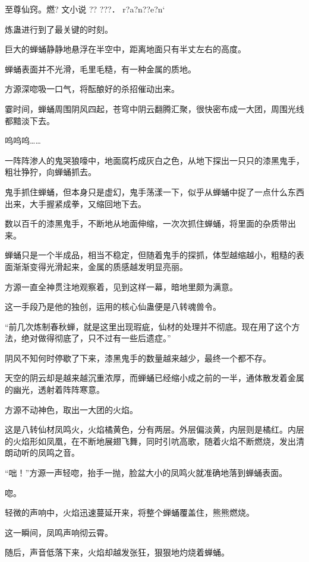 
\begin{this_body}

至尊仙窍。燃? 文小说 ??   ???． r?a?n??e?n`

炼蛊进行到了最关键的时刻。

巨大的蝉蛹静静地悬浮在半空中，距离地面只有半丈左右的高度。

蝉蛹表面并不光滑，毛里毛糙，有一种金属的质地。

方源深唿吸一口气，将酝酿好的杀招催动出来。

霎时间，蝉蛹周围阴风四起，苍穹中阴云翻腾汇聚，很快密布成一大团，周围光线都黯淡下去。

呜呜呜……

一阵阵渗人的鬼哭狼嚎中，地面腐朽成灰白之色，从地下探出一只只的漆黑鬼手，粗壮狰狞，向蝉蛹抓去。

鬼手抓住蝉蛹，但本身只是虚幻，鬼手荡漾一下，似乎从蝉蛹中捉了一点什么东西出来，大手握紧成拳，又缩回地下去。

数以百千的漆黑鬼手，不断地从地面伸缩，一次次抓住蝉蛹，将里面的杂质带出来。

蝉蛹只是一个半成品，相当不稳定，但随着鬼手的探抓，体型越缩越小，粗糙的表面渐渐变得光滑起来，金属的质感越发明显亮丽。

方源一直全神贯注地观察着，见到这样一幕，暗地里颇为满意。

这一手段乃是他的独创，运用的核心仙蛊便是八转魂兽令。

“前几次炼制春秋蝉，就是这里出现瑕疵，仙材的处理并不彻底。现在用了这个方法，绝对做得彻底了，只不过有一些后遗症。”

阴风不知何时停歇了下来，漆黑鬼手的数量越来越少，最终一个都不存。

天空的阴云却是越来越沉重浓厚，而蝉蛹已经缩小成之前的一半，通体散发着金属的幽光，透射着阵阵寒意。

方源不动神色，取出一大团的火焰。

这是八转仙材凤鸣火，火焰橘黄色，分有两层。外层偏淡黄，内层则是橘红。内层的火焰形如凤凰，在不断地展翅飞舞，同时引吭高歌，随着火焰不断燃烧，发出清朗动听的凤鸣之音。

“咄！”方源一声轻唿，抬手一抛，脸盆大小的凤鸣火就准确地落到蝉蛹表面。

唿。

轻微的声响中，火焰迅速蔓延开来，将整个蝉蛹覆盖住，熊熊燃烧。

这一瞬间，凤鸣声响彻云霄。

随后，声音低落下来，火焰却越发张狂，狠狠地灼烧着蝉蛹。


\end{this_body}
